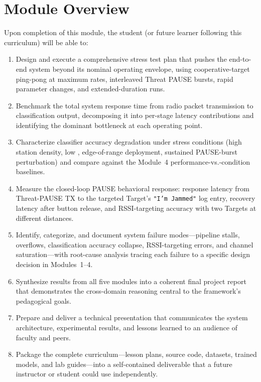 \documentclass[11pt,letterpaper]{article}
\begin{document}
	\tableofcontents
	\newpage

	\section{Module Overview}

	\begin{tcolorbox}[objective={Module 5 Learning Objectives}]
		Upon completion of this module, the student (or future learner following this curriculum) will be able to:
		\begin{enumerate}[label=\textbf{LO-\arabic*}]
			\item Design and execute a comprehensive stress test plan that pushes the end-to-end system beyond its nominal operating envelope, using cooperative-target ping-pong at maximum rates, interleaved Threat PAUSE bursts, rapid parameter changes, and extended-duration runs.
			\item Benchmark the total system response time from radio packet transmission to classification output, decomposing it into per-stage latency contributions and identifying the dominant bottleneck at each operating point.
			\item Characterize classifier accuracy degradation under stress conditions (high station density, low \SNR{}, edge-of-range deployment, sustained PAUSE-burst perturbation) and compare against the Module~4 performance-vs.-condition baselines.
			\item Measure the closed-loop PAUSE behavioral response: response latency from Threat-PAUSE TX to the targeted Target's \texttt{"I'm Jammed"} log entry, recovery latency after button release, and RSSI-targeting accuracy with two Targets at different distances.
			\item Identify, categorize, and document system failure modes---pipeline stalls, \FIFO{} overflows, classification accuracy collapse, RSSI-targeting errors, and \RF{} channel saturation---with root-cause analysis tracing each failure to a specific design decision in Modules~1--4.
			\item Synthesize results from all five modules into a coherent final project report that demonstrates the cross-domain reasoning central to the framework's pedagogical goals.
			\item Prepare and deliver a technical presentation that communicates the system architecture, experimental results, and lessons learned to an audience of faculty and peers.
			\item Package the complete curriculum---lesson plans, source code, datasets, trained models, and lab guides---into a self-contained deliverable that a future instructor or student could use independently.
		\end{enumerate}
	\end{tcolorbox}
\end{document}

